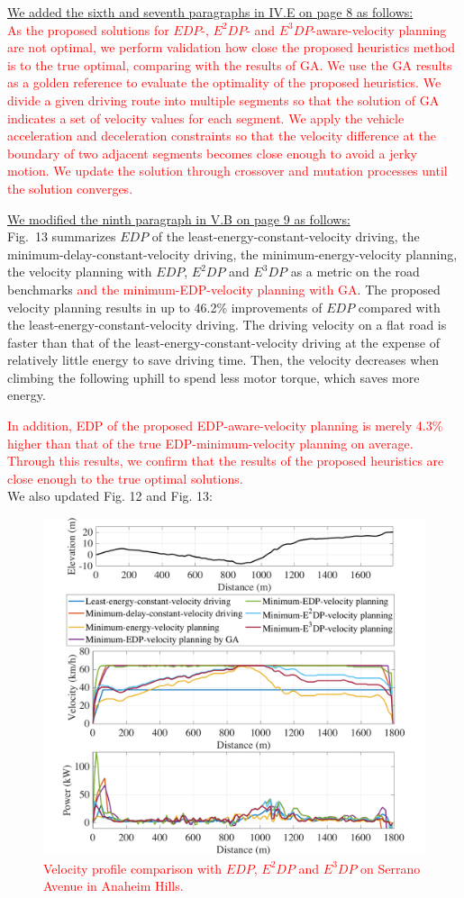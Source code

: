 \documentclass[onecolumn]{IEEEconf}
\begin{document}
\begin{description}
\uline{We added the sixth and seventh paragraphs in IV.E on page 8 as follows:}\\
\textcolor{red}{As the proposed solutions for  $EDP$-, $E^2DP$- and $E^3DP$-aware-velocity planning are not optimal, we perform  validation how close the proposed heuristics method is to the true optimal, comparing with the results of GA. We use the GA results as a golden reference to evaluate the optimality of the proposed heuristics. We divide a given driving route into multiple segments so that the solution of GA indicates a set of velocity values for each segment. We apply the vehicle acceleration and deceleration constraints so that the velocity difference at the boundary of two adjacent segments becomes close enough to avoid a jerky motion. We update the solution through crossover and mutation processes until the solution converges.} 

\uline{We modified the ninth paragraph in V.B on page 9 as follows:}\\
Fig.~13 summarizes $EDP$ of the least-energy-constant-velocity driving, the minimum-delay-constant-velocity driving, the minimum-energy-velocity planning, the velocity planning with $EDP$, $E^2DP$ and $E^3DP$ as a metric on the road benchmarks \textcolor{red}{and the minimum-EDP-velocity planning with GA}. The proposed velocity planning results in up to 46.2\% improvements of $EDP$ compared with the least-energy-constant-velocity driving. 
The driving velocity on a flat road is faster than that of the least-energy-constant-velocity driving at the expense of relatively little energy to save driving time. Then, the velocity decreases when climbing the following uphill to spend less motor torque, which saves more energy.

\textcolor{red}{In addition, EDP of the proposed EDP-aware-velocity planning is merely 4.3\% higher than that of the true EDP-minimum-velocity planning on average. Through this results, we confirm that the results of the proposed heuristics are close enough to the true optimal solutions.}\\

We also updated Fig. 12 and Fig. 13:

\begin{figure} [h!]
\centering
\renewcommand\thefigure{12}
\includegraphics[width=0.6\hsize]{Figures/EDP_comp_profile.pdf}
\caption{\textcolor{red}{Velocity profile comparison with $EDP$, $E^2DP$ and $E^3DP$ on  Serrano Avenue in Anaheim Hills.}}
\label{fig:EDP_aware_velocity_planning}
\end{figure} 


\end{description}
\end{document}
